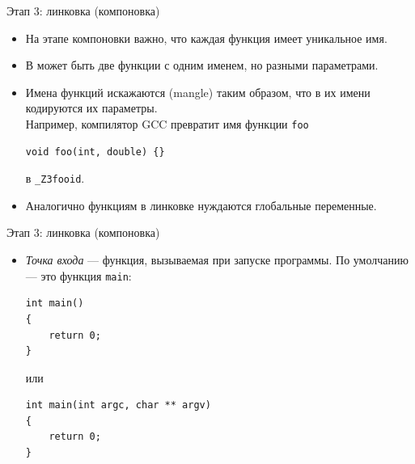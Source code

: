\documentclass[aspectration=1610,t]{beamer}
\begin{document}
\begin{frame}[fragile]{Этап 3: линковка (компоновка)}
\begin{itemize}
    \item На этапе компоновки важно, что каждая функция имеет уникальное имя.

    \item В \langcpp может быть две функции с одним именем, но разными
        параметрами.

    \item Имена функций искажаются (mangle) таким образом, что в их имени
        кодируются их параметры.\\
Например, компилятор GCC превратит имя функции \verb!foo!
\begin{lstlisting}
void foo(int, double) {}
\end{lstlisting}
в \verb!_Z3fooid!.

\item Аналогично функциям в линковке нуждаются глобальные переменные.

\end{itemize}
\end{frame}

\begin{frame}[fragile]{Этап 3: линковка (компоновка)}
\begin{itemize}
    \item \emph{Точка входа} — функция, вызываемая при запуске программы.
        По умолчанию — это функция \verb!main!:
\begin{lstlisting}
int main()
{
    return 0;
}
\end{lstlisting}
или
\begin{lstlisting}
int main(int argc, char ** argv)
{
    return 0;
}
\end{lstlisting}
\end{itemize}
\end{frame}
\end{document}
